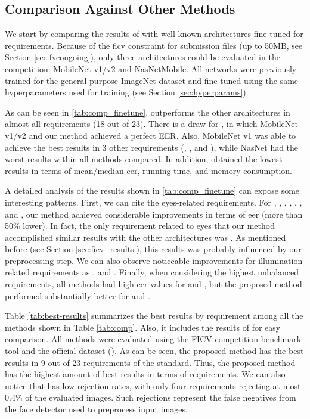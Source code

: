 \subsection{Comparison Against Other Methods}

We start by comparing the results of \methodname with well-known architectures fine-tuned for \icao requirements. Because of the \acs{ficv} constraint for submission files (up to 50MB, see Section \ref{sec:fvcongoing}), only three architectures could be evaluated in the competition: MobileNet v1/v2 and NasNetMobile. All networks were previously trained for the general purpose ImageNet dataset \citep{imagenetdataset} and fine-tuned using the same hyperparameters used for \methodname training (see Section \ref{sec:hyperparams}).

As can be seen in \autoref{tab:comp_finetune}, \methodname outperforms the other architectures in almost all requirements (18 out of 23). There is a draw for \veiloverface, in which MobileNet v1/v2 and our method achieved a perfect EER. Also, MobileNet v1 was able to achieve the best results in 3 other requirements (\pixelation, \hatcap, and \otherfacesortoys), while NasNet had the worst results within all methods compared. In addition, \methodname obtained the lowest results in terms of mean/median \acs{eer}, running time, and memory consumption.

A detailed analysis of the results shown in \autoref{tab:comp_finetune} can expose some interesting patterns. First, we can cite the eyes-related requirements. For \lookingaway, \eyesclosed, \redeyes, \darktintedlenses, \flashlenses, \framestooheavy, and \framecoveringeyes, our method achieved considerable improvements in terms of \acs{eer} (more than 50\% lower). In fact, the only requirement related to eyes that our method accomplished similar results with the other architectures was \hairacrosseyes. As mentioned before (see Section \ref{sec:ficv_results}), this results was probably influenced by our preprocessing step. We can also observe noticeable improvements for illumination-related requirements as \toodarklight, \shadowsbehindhead and \shadowsacrossface. Finally, when considering the highest unbalanced requirements, all methods had high \acs{eer} values for \inkmarked and \otherfacesortoys, but the proposed method performed substantially better for \washedout and \framestooheavy.



Table \ref{tab:best-results} summarizes the best results by requirement among all the methods shown in Table \ref{tab:comp}. Also, it includes the results of \methodname for easy comparison. All methods were evaluated using the FICV competition benchmark tool and the official dataset (\ficvofficial). As can be seen, the proposed method has the best results in 9 out of 23 requirements of the \icao standard. Thus, the proposed method has the highest amount of best results in terms of requirements. We can also notice that \methodname has low rejection rates, with only four requirements rejecting at most 0.4\% of the evaluated images. Such rejections represent the false negatives from the face detector used to preprocess input images.

